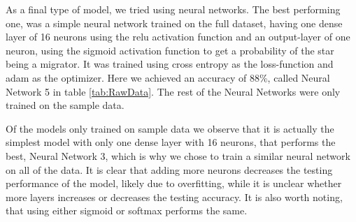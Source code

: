 As a final type of model, we tried using neural networks. The best performing one, was a simple neural network trained on the full dataset, having one dense layer of 16 neurons using the relu activation function and an output-layer of one neuron, using the sigmoid activation function to get a probability of the star being a migrator. It was trained using cross entropy as the loss-function and adam as the optimizer. Here we achieved an accuracy of 88\%, called Neural Network 5 in table \ref{tab:RawData}. The rest of the Neural Networks were only trained on the sample data.

Of the models only trained on sample data we observe that it is actually the simplest model with only one dense layer with 16 neurons, that performs the best, Neural Network 3, which is why we chose to train a similar neural network on all of the data. It is clear that adding more neurons decreases the testing performance of the model, likely due to overfitting, while it is unclear whether more layers increases or decreases the testing accuracy. It is also worth noting, that using either sigmoid or softmax performs the same.